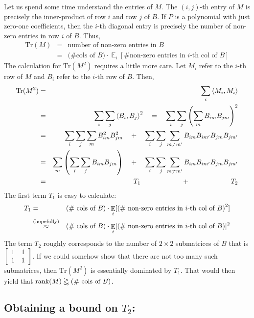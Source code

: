 Let us spend some time understand the entries of $M$. 
The $(i,j)$-th entry of $M$ is precisely the inner-product of row $i$ and row $j$ of $B$. 
If $P$ is a polynomial with just zero-one coefficients, then the $i$-th diagonal entry is precisely the number of non-zero entries in row $i$ of $B$. 
Thus,
\begin{eqnarray*}
\mathrm{Tr}(M) & = & \text{number of non-zero entries in $B$}\\
  & = & \text{(\# cols of $B$)} \cdot \mathop{\mathbb{E}}_i[\text{\# non-zero entries in $i$-th col of $B$}] 
\end{eqnarray*}
The calculation for $\mathrm{Tr}(M^2)$ requires a little more care. 
Let $M_i$ refer to the $i$-th row of $M$ and $B_i$ refer to the $i$-th row of $B$. 
Then,
\begin{eqnarray*}
\mathrm{Tr}(M^2) & = & \sum_{i} \left\langle M_i, M_i\right\rangle\\
 & = & \sum_{i} \sum_j \left\langle B_i, B_j\right\rangle^2 \quad = \quad\sum_{i} \sum_j \left(\sum_m B_{im} B_{jm}\right)^2\\
 & = & \sum_{i} \sum_j \sum_m B_{im}^2 B_{jm}^2  \quad + \quad \sum_i \sum_j \sum_{m\neq m'} B_{im}B_{im'}B_{jm}B_{jm'}\\
 & = & \sum_{m} \left(\sum_i \sum_j B_{im} B_{jm}\right)  \quad + \quad \sum_i \sum_j \sum_{m\neq m'} B_{im}B_{im'}B_{jm}B_{jm'}\\
 & = & \quad\quad\quad T_1 \quad\quad\quad\quad\quad\quad + \quad\quad\quad\quad\quad\quad T_2
\end{eqnarray*}
The first term $T_1$ is easy to calculate:
\begin{eqnarray*}
T_1 & = & \text{(\# cols of $B$)} \cdot \mathop{\mathbb{E}}_i[\left(\text{\# non-zero entries in $i$-th col of $B$}\right)^2] \\
 & \stackrel{\tiny \text{(hopefully)}}{\approx} & \text{(\# cols of $B$)} \cdot \mathop{\mathbb{E}}_i[\left(\text{\# non-zero entries in $i$-th col of $B$}\right)]^2
\end{eqnarray*}
The term $T_2$ roughly corresponds to the number of $2\times 2$ submatrices of $B$ that is $\left[\begin{array}{cc}1 & 1 \\ 1 & 1\end{array}\right]$. 
If we could somehow show that there are not too many such submatrices, then $\mathrm{Tr}(M^2)$ is essentially dominated by $T_1$. 
That would then yield that $\operatorname{rank}(M) \gtrapprox \text{(\# cols of $B$)}$. 

\subsection*{Obtaining a bound on $T_2$:}

